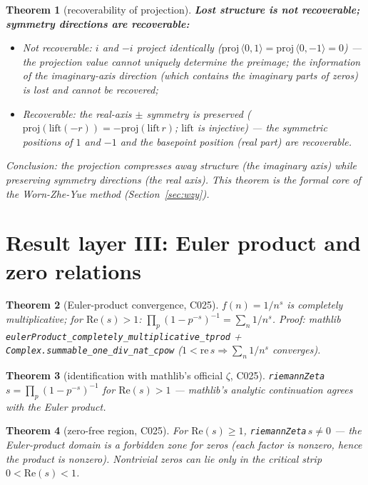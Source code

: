\documentclass[11pt]{article}
\newtheorem{theorem}{Theorem}
\theoremstyle{remark}
\begin{document}
\begin{theorem}[recoverability of projection]
\label{thm:recovery}
\textbf{Lost structure is not recoverable; symmetry directions are
recoverable:}
\begin{itemize}
  \item \emph{Not recoverable:} $i$ and $-i$ project identically
        ($\mathrm{proj}\,\langle 0,1\rangle=\mathrm{proj}\,\langle 0,-1\rangle=0$)
        --- the projection value cannot uniquely determine the preimage; the
        information of the imaginary-axis direction (which contains the
        imaginary parts of zeros) is lost and cannot be recovered;
  \item \emph{Recoverable:} the real-axis $\pm$ symmetry is preserved
        ($\mathrm{proj}(\mathrm{lift}(-r))=-\mathrm{proj}(\mathrm{lift}\,r)$;
        $\mathrm{lift}$ is injective) --- the symmetric positions of $1$ and
        $-1$ and the basepoint position (real part) are recoverable.
\end{itemize}
\emph{Conclusion:} the projection compresses away structure (the imaginary
axis) while preserving symmetry directions (the real axis). This theorem is
the formal core of the Worn-Zhe-Yue method (Section~\ref{sec:wzy}).
\end{theorem}

\section{Result layer III: Euler product and zero relations}
\label{sec:layerIII}

\begin{theorem}[Euler-product convergence, C025]
\label{thm:euler}
$f(n)=1/n^s$ is completely multiplicative; for $\mathrm{Re}(s)>1$:
$\prod_p (1-p^{-s})^{-1}=\sum_n 1/n^s$. \emph{Proof:} mathlib
\texttt{eulerProduct\_completely\_multiplicative\_tprod} +
\texttt{Complex.summable\_one\_div\_nat\_cpow} ($1<\mathrm{re}\,s \Rightarrow
\sum_n 1/n^s$ converges).
\end{theorem}

\begin{theorem}[identification with mathlib's official $\zeta$, C025]
\label{thm:identify}
\texttt{riemannZeta}\,$s=\prod_p (1-p^{-s})^{-1}$ for
$\mathrm{Re}(s)>1$ --- mathlib's analytic continuation agrees with the Euler
product.
\end{theorem}

\begin{theorem}[zero-free region, C025]
\label{thm:zerofree}
For $\mathrm{Re}(s)\geq 1$, \texttt{riemannZeta}\,$s\neq 0$ --- the
Euler-product domain is a forbidden zone for zeros (each factor is nonzero,
hence the product is nonzero). Nontrivial zeros can lie only in the critical
strip $0<\mathrm{Re}(s)<1$.
\end{theorem}
\end{document}
